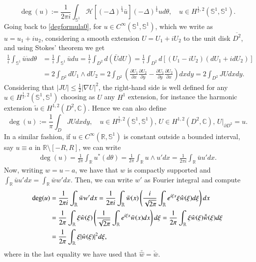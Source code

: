 \documentclass[12pt, a4paper]{article}
\newcommand{\sph}{\mathbb{S}}
\newcommand{\R}{\mathbb{R}}
\newcommand{\cl}[1]{\overline{#1}}
\renewcommand{\(}{\left(}
\renewcommand{\)}{\right)}
\begin{document}
\begin{equation}\label{degformulaH}
\deg (u):= \frac{1}{2\pi i}\int_{\sph^1} \mathcal{H}[(-\Delta)^{\frac14} \bar u] (-\Delta)^{\frac14} u d\theta,  \quad u\in H^{\frac{1}{2},2}(\sph^1,\sph^1).
\end{equation}
Going back to \eqref{degformula0}, for $u\in C^\infty(\sph^1,\sph^1)$, which we write as $u=u_1+iu_2$, considering a smooth extension $U=U_1+iU_2$ to the unit disk $\cl{D^2}$, and using Stokes' theorem we get
\begin{equation*}
\begin{split}
\frac{1}{i }\int_{\sph^1} \bar u \dot u d\theta&=\frac{1}{i}\int_{\sph^1}\bar u d u=\frac{1}{ i} \int_{D^2} d(\bar U dU) =\frac{1}{ i} \int_{D^2} d[(U_1-iU_2)(dU_1+idU_2)]\\
&=2\int_{D^2} dU_1\wedge dU_2=2\int_{D^2}\(\frac{\partial U_1}{\partial x} \frac{\partial U_2}{\partial y}-\frac{\partial U_1}{\partial y}\frac{\partial U_2}{\partial x}\)dxdy=2\int_{D^2} JU dxdy.
\end{split}
\end{equation*}
Considering that $|JU|\le \tfrac{1}{2}|\nabla U|^2$, the right-hand side is well defined for any $u\in H^{\frac{1}{2},2}(\sph^1,\sph^1)$ choosing as $U$ any $H^1$ extension, for instance the harmonic extension $\tilde u\in H^{1,2}(D^2,\mathbb{C})$. Hence we can also define
\begin{equation}\label{degformula2}
\deg(u):=\frac{1}{\pi}\int_D JU dxdy,\quad u\in H^{\frac{1}{2},2}(\sph^1,\sph^1), \, U\in H^{1,2}(D^2,\mathbb{C}), \, U|_{\partial D^2}=u.
\end{equation}
In a similar fashion, if $u\in C^\infty(\R,\sph^1)$ is constant outside a bounded interval, say $u\equiv a$ in  $\R\setminus [-R,R]$, we can write
\begin{align}\label{46}\deg(u)=\frac{1}{2\pi}\int_{\R}u^*(d\theta)=\frac{1}{2\pi} \int_{\R} u\wedge u' dx= \frac{1}{2\pi i}\int_\R \bar u u' dx.\end{align}
Now, writing $w=u-a$, we have that $w$ is compactly supported and $\int_\R \bar u u' dx=\int_\R \bar w w' dx$.
Then, we can write  $w'$ as Fourier integral and compute   
 \begin{align}\label{degintR} 
\deg(u)&=\frac{1}{2\pi i}\int_\R \bar w w' dx\notag=\frac{1}{2\pi i}\int_\R \bar w(x) \left(\frac{i}{\sqrt{2\pi}}\int_\R e^{i\xi x} \xi \hat w(\xi) d\xi  \right)dx \notag\\&=\frac{1}{2\pi }\int_\R \xi\hat w(\xi) \left(\frac{1}{\sqrt{2\pi}}\int_\R e^{i\xi x} \bar w(x) dx  \right)d\xi \notag =\frac{1}{2\pi }\int_\R \xi\hat w(\xi) \check{\bar w}(\xi) d\xi\notag \\ &=\frac{1}{2\pi}\int_{\R}\xi |\hat w(\xi)|^2 d\xi,
\end{align} where in the last equality we have used that $\bar {\hat w}=\check{\bar w}$. 
\end{document}
